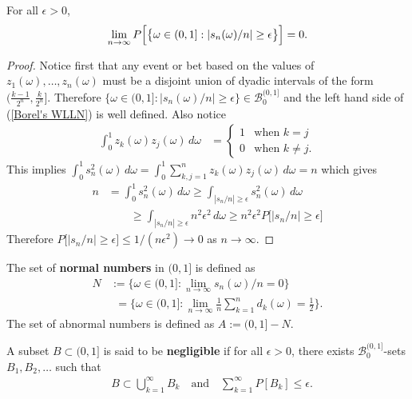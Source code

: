 \begin{theorem}[{\bf WLLN}]
For all $\epsilon>0$,
\begin{equation}
\label{Borel's WLLN}
\lim_{n\rightarrow \infty}P\Bigl[\bigl\{\omega\in (0,1]: \left|{s_n(\omega)}/n \right|\geq\epsilon \bigr\} \Bigr] =0.
\end{equation}
\end{theorem}
\begin{proof}
Notice first that any event or bet based on the values of $z_1(\omega), \ldots, z_n(\omega)$ must be a disjoint union of dyadic intervals of the form $(\frac{k-1}{2^n}, \frac{k}{2^n}]$. Therefore $\bigl\{\omega\in (0,1]: \left|{s_n(\omega)}/n \right| \geq \epsilon \bigr\} \in \mathcal B_0^{(0,1]}$ and the left hand side of (\ref{Borel's WLLN}) is well defined. Also notice
\begin{align*}
\int_0^1 z_k(\omega)z_j(\omega)\, d\omega
& = \begin{cases}
1 & \text{when $k=j$}\\
0 & \text{when $k\neq j$}.
\end{cases}
\end{align*}
This implies $\int_0^1 s^2_n(\omega)\, d\omega = \int_0^1 \sum_{k,j=1}^n z_k(\omega)z_j(\omega) \,d\omega = n$ which gives
\begin{align*}
n  &= \int_0^1 s^2_n(\omega)\, d\omega  \geq \int_{|s_n/n|\geq \epsilon} s^2_n(\omega)\, d\omega \\
& \qquad \geq \int_{|s_n/n|\geq \epsilon} n^2\epsilon^2\, d\omega  \geq n^2\epsilon^2 P\bigl[|s_n/n|\geq \epsilon\bigr]
\end{align*}
Therefore $P\bigl[|s_n/n|\geq \epsilon\bigr]\leq 1/(n\epsilon^2)\rightarrow 0$ as $n\rightarrow \infty$.
\end{proof}

\begin{definition}
The set of {\bf normal numbers} in $(0,1]$ is defined as
\begin{align*}
N
&:=\{\omega\in(0,1]: \lim_{n\rightarrow \infty} {s_n(\omega)}/n =0\}\\
&\phantom{:}=\{\omega\in(0,1]: \lim_{n\rightarrow \infty} \textstyle\frac{1}{n}\textstyle\sum_{k=1}^n d_k(\omega) = \textstyle\frac{1}{2}\}.
\end{align*}
The set of abnormal numbers is defined as $A:=(0,1]-N$.
\end{definition}


\begin{definition}
A subset $B\subset (0,1]$ is said to be {\bf negligible} if for all $\epsilon>0$, there exists $\mathcal B_0^{(0,1]}$-sets $B_1, B_2,\ldots$ such that
\begin{align*}
&B\subset \bigcup_{k=1}^\infty B_k\quad\text{and}\quad\sum_{k=1}^\infty P[B_k]\leq \epsilon.
\end{align*}
\end{definition}

